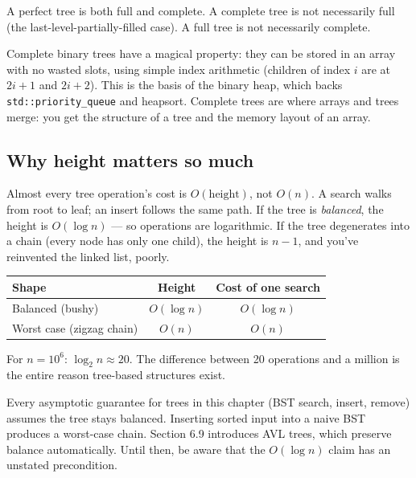 \documentclass[11pt]{article}
\begin{document}
A perfect tree is both full and complete. A complete tree is not
necessarily full (the last-level-partially-filled case). A full
tree is not necessarily complete.

\begin{ideabox}
Complete binary trees have a magical property: they can be stored
in an array with no wasted slots, using simple index arithmetic
(children of index $i$ are at $2i+1$ and $2i+2$). This is the
basis of the binary heap, which backs \texttt{std::priority\_queue}
and heapsort. Complete trees are where arrays and trees merge:
you get the structure of a tree and the memory layout of an array.
\end{ideabox}

\subsection*{Why height matters so much}

Almost every tree operation's cost is $O(\text{height})$, not
$O(n)$. A search walks from root to leaf; an insert follows the
same path. If the tree is \emph{balanced}, the height is
$O(\log n)$ --- so operations are logarithmic. If the tree
degenerates into a chain (every node has only one child), the
height is $n - 1$, and you've reinvented the linked list, poorly.

\begin{center}
\begin{tabular}{|l|c|c|}
\hline
\textbf{Shape} & \textbf{Height} & \textbf{Cost of one search} \\
\hline
Balanced (bushy) & $O(\log n)$ & $O(\log n)$ \\
Worst case (zigzag chain) & $O(n)$ & $O(n)$ \\
\hline
\end{tabular}
\end{center}

For $n = 10^6$: $\log_2 n \approx 20$. The difference between
20 operations and a million is the entire reason tree-based
structures exist.

\begin{warnbox}
Every asymptotic guarantee for trees in this chapter (BST
search, insert, remove) assumes the tree stays balanced.
Inserting sorted input into a naive BST produces a worst-case
chain. Section 6.9 introduces AVL trees, which preserve balance
automatically. Until then, be aware that the $O(\log n)$ claim
has an unstated precondition.
\end{warnbox}
\end{document}
